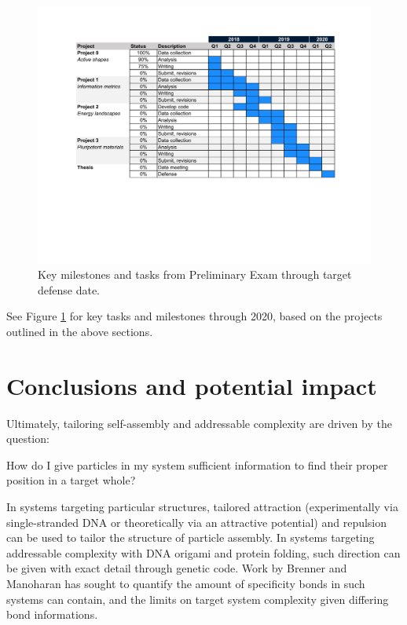 \documentclass[11pt, oneside]{article}   	%
\begin{document}
\begin{figure}[t]
\begin{center}
\includegraphics[width=6.5in]{../figures/gantt.pdf}
\caption{Key milestones and tasks from Preliminary Exam through target defense date.}
\label{fig:gantt}
\end{center}
\end{figure}

See Figure \ref{fig:gantt} for key tasks and milestones through 2020, based on the projects outlined in the above sections.

\section{Conclusions and potential impact}

Ultimately, tailoring self-assembly and addressable complexity are driven by the question:

\begin{center}How do I give particles in my system sufficient information to find their proper position in a target whole?\end{center}

In systems targeting particular structures, tailored attraction (experimentally via single-stranded DNA or theoretically via an attractive potential) and repulsion can be used to tailor the structure of particle assembly.
In systems targeting addressable complexity with DNA origami and protein folding, such direction can be given with exact detail through genetic code.
Work by Brenner and Manoharan has sought to quantify the amount of specificity bonds in such systems can contain, and the limits on target system complexity given differing bond informations.
\end{document}
